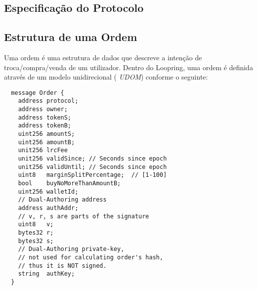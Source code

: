 \documentclass[UTF8,nofonts]{article}
\begin{document}
\begin{multicols}{2}


\section{Especificação do Protocolo\label{sec:protocol}}

\subsection{Estrutura de uma Ordem\label{anatomy}}


Uma ordem é uma estrutura de dados que descreve a intenção de troca/compra/venda de um utilizador. Dentro do Loopring, uma ordem é definida através de um modelo unidirecional ( \textit{UDOM}) conforme o seguinte:

\begin{verbatim}
  message Order {
    address protocol;
    address owner;
    address tokenS;
    address tokenB;
    uint256 amountS;
    uint256 amountB;
    unit256 lrcFee
    unit256 validSince; // Seconds since epoch
    unit256 validUntil; // Seconds since epoch
    uint8   marginSplitPercentage;  // [1-100]
    bool    buyNoMoreThanAmountB;
    uint256 walletId;
    // Dual-Authoring address
    address authAddr;
   	// v, r, s are parts of the signature
    uint8   v;       
    bytes32 r;
    bytes32 s;
    // Dual-Authoring private-key,
    // not used for calculating order's hash,
    // thus it is NOT signed.
    string  authKey;          
  }
\end{verbatim}



\end{multicols}
\end{document}
